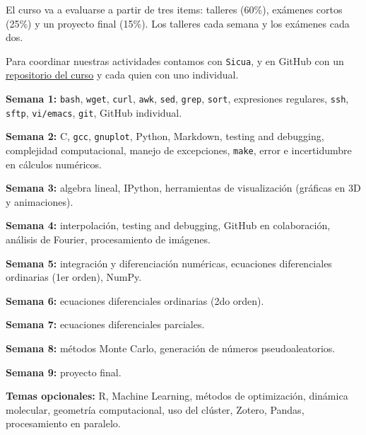 \documentclass[letterpaper,10pt,onecolumn]{article}
\begin{document}
\vspace{0.3cm}
\noindent El curso va a evaluarse a partir de tres items: talleres (60\%), exámenes cortos (25\%) y un proyecto final (15\%). Los talleres cada semana y los exámenes cada dos.

\noindent Para coordinar nuestras actividades contamos con \verb+Sicua+, y en GitHub con un \href{https://github.com/ComputoCienciasUniandes/MetodosComputacionales}{repositorio del curso} y cada quien con uno individual.

\vspace{0.5cm}

\noindent\textbf{Semana 1:} \verb+bash+, \verb+wget+, \verb+curl+, \verb+awk+, \verb+sed+, \verb+grep+, \verb+sort+, expresiones regulares, \verb+ssh+, \verb+sftp+, \verb+vi/emacs+, \verb+git+, GitHub individual.

\noindent\textbf{Semana 2:} C, \verb+gcc+, \verb+gnuplot+, Python, Markdown, testing and debugging, complejidad computacional, manejo de excepciones, \verb+make+, error e incertidumbre en cálculos numéricos.

\noindent\textbf{Semana 3:} algebra lineal, IPython, herramientas de visualización (gráficas en 3D y animaciones).

\noindent\textbf{Semana 4:} interpolación, testing and debugging, GitHub en colaboración, análisis de Fourier, procesamiento de imágenes.

\noindent\textbf{Semana 5:} integración y diferenciación numéricas, ecuaciones diferenciales ordinarias (1er orden), NumPy.

\noindent\textbf{Semana 6:} ecuaciones diferenciales ordinarias (2do orden).

\noindent\textbf{Semana 7:} ecuaciones diferenciales parciales.

\noindent\textbf{Semana 8:} métodos Monte Carlo, generación de números pseudoaleatorios.

\noindent\textbf{Semana 9:} proyecto final.

\vspace{0.1cm}
\noindent\textbf{Temas opcionales:} R, Machine Learning, métodos de optimización, dinámica molecular, geometría computacional, uso del clúster, Zotero, Pandas, procesamiento en paralelo.
\end{document}
